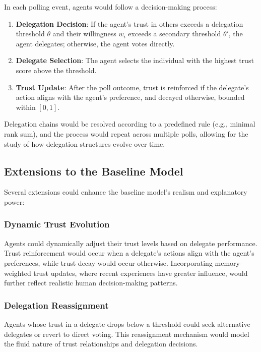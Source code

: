 In each polling event, agents would follow a decision-making process:

\begin{enumerate}
    \item \textbf{Delegation Decision}: If the agent's trust in others exceeds a delegation threshold $\theta$ and their willingness $w_i$ exceeds a secondary threshold $\theta'$, the agent delegates; otherwise, the agent votes directly.
    \item \textbf{Delegate Selection}: The agent selects the individual with the highest trust score above the threshold.
    \item \textbf{Trust Update}: After the poll outcome, trust is reinforced if the delegate's action aligns with the agent's preference, and decayed otherwise, bounded within $[0,1]$.
\end{enumerate}

Delegation chains would be resolved according to a predefined rule (e.g., minimal rank sum), and the process would repeat across multiple polls, allowing for the study of how delegation structures evolve over time.

\subsection{Extensions to the Baseline Model}

Several extensions could enhance the baseline model's realism and explanatory power:

\subsubsection{Dynamic Trust Evolution}

Agents could dynamically adjust their trust levels based on delegate performance. Trust reinforcement would occur when a delegate's actions align with the agent's preferences, while trust decay would occur otherwise. Incorporating memory-weighted trust updates, where recent experiences have greater influence, would further reflect realistic human decision-making patterns.

\subsubsection{Delegation Reassignment}

Agents whose trust in a delegate drops below a threshold could seek alternative delegates or revert to direct voting. This reassignment mechanism would model the fluid nature of trust relationships and delegation decisions.


